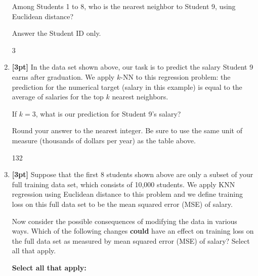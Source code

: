 \begin{enumerate}
    Among Students 1 to 8, who is the nearest neighbor to Student 9, using Euclidean distance?
    
    Answer the Student ID only.

    \begin{tcolorbox}[fit,height=1cm, width=4cm, blank, borderline={1pt}{-2pt},nobeforeafter]
    \begin{center}\huge3\end{center}
    \end{tcolorbox}

 
    
    
    \item \textbf{[3pt]} In the data set shown above, our task is to predict the salary Student 9 earns after graduation. We apply $k$-NN to this regression problem: the prediction for the numerical target (salary in this example) is equal to the average of salaries for the top $k$ nearest neighbors. 
    
    If $k=3$, what is our prediction for Student 9's salary?
    
    Round your answer to the nearest integer. Be sure to use the same unit of measure (thousands of dollars per year) as the table above.
    
    \begin{tcolorbox}[fit,height=1cm, width=4cm, blank, borderline={1pt}{-2pt},nobeforeafter]
    \begin{center}\huge132\end{center}
    \end{tcolorbox}
    
    

\newpage
    \item \textbf{[3pt]} Suppose that the first 8 students shown above are only a subset of your full training data set, which consists of 10,000 students. We apply KNN regression using Euclidean distance to this problem and we define training loss on this full data set to be the mean squared error (MSE) of salary.

    Now consider the possible consequences of modifying the data in various ways. Which of the following changes \textbf{could} have an effect on training loss on the full data set as measured by mean squared error (MSE) of salary? Select all that apply.
    
    
        
    \textbf{Select all that apply:}


\end{enumerate}
